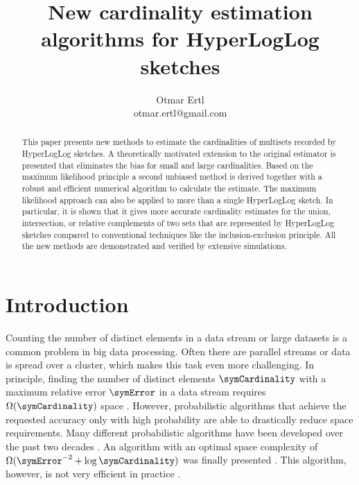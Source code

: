 \documentclass[a4paper]{scrartcl}
\title{New cardinality estimation algorithms for HyperLogLog sketches}
\author{Otmar Ertl \\ otmar.ertl@gmail.com}
\begin{document}
\maketitle
\let\thefootnote\relax{}
\begin{abstract}
This paper presents new methods to estimate the cardinalities of multisets recorded by HyperLogLog sketches. A theoretically motivated extension to the original estimator is presented that eliminates the bias for small and large cardinalities. Based on the maximum likelihood principle a second unbiased method is derived together with a robust and efficient numerical algorithm to calculate the estimate. The maximum likelihood approach can also be applied to more than a single HyperLogLog sketch. In particular, it is shown that it gives more accurate cardinality estimates for the union, intersection, or relative complements of two sets that are represented by HyperLogLog sketches compared to conventional techniques like the inclusion-exclusion principle. All the new methods are demonstrated and verified by extensive simulations.
\end{abstract}

\section{Introduction}
Counting the number of distinct elements in a data stream or large datasets is a common problem in big data processing. Often there are parallel streams  or data is spread over a cluster, which makes this task even more challenging.
In principle, finding the number of distinct elements $\symCardinality$ with a maximum relative error $\symError$  in a data stream requires $\Omega(\symCardinality)$ space \cite{Alon1999}. However, probabilistic algorithms that achieve the requested accuracy only with high probability are able to drastically reduce space requirements. Many different probabilistic algorithms have been developed over the past two decades \cite{Metwally2008,Ting2014}. An algorithm with an optimal space complexity of $\Omega(\symError^{-2}+\log \symCardinality)$ \cite{Alon1999, Indyk2003} was finally presented \cite{Kane2010}. This algorithm, however, is not very efficient in practice \cite{Ting2014}.
\end{document}
